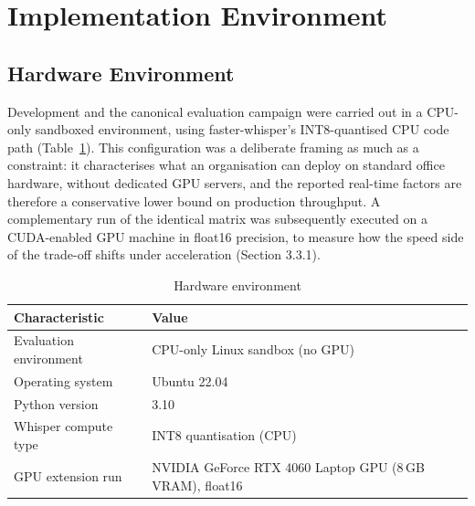 \documentclass[12pt]{report}
\begin{document}
\section{Implementation Environment}
\subsection{Hardware Environment}
Development and the canonical evaluation campaign were carried out in a CPU-only sandboxed environment, using faster-whisper's INT8-quantised CPU code path (Table~\ref{tab:hardware}). This configuration was a deliberate framing as much as a constraint: it characterises what an organisation can deploy on standard office hardware, without dedicated GPU servers, and the reported real-time factors are therefore a conservative lower bound on production throughput. A complementary run of the identical matrix was subsequently executed on a CUDA-enabled GPU machine in float16 precision, to measure how the speed side of the trade-off shifts under acceleration (Section 3.3.1).
\begin{table}[H]
\centering
\begin{tabular}{|l|l|}
\hline
\textbf{Characteristic} & \textbf{Value} \\ \hline
Evaluation environment & CPU-only Linux sandbox (no GPU) \\ \hline
Operating system & Ubuntu 22.04 \\ \hline
Python version & 3.10 \\ \hline
Whisper compute type & INT8 quantisation (CPU) \\ \hline
GPU extension run & NVIDIA GeForce RTX 4060 Laptop GPU (8\,GB VRAM), float16 \\ \hline
\end{tabular}
\caption{Hardware environment}
\label{tab:hardware}
\end{table}
\end{document}
